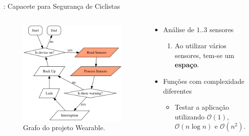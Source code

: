     \begin{frame}{\Wearable: Capacete para Segurança de Ciclistas}
        \vspace{-0.8em}
        
        \begin{columns}
            \begin{column}{0.6\textwidth}
                
                \begin{figure}[h] \centering
                    \includegraphics[width=1\textwidth]{img/capacete2.png}
                    \vspace{-1em}
                    \caption{Grafo do projeto Wearable.}
                \end{figure}
            \end{column}
            \begin{column}{0.4\textwidth}
                \vspace{-1cm}
                \begin{itemize}
                    \setlength{\itemsep}{1.4em}
                    \item Análise de $1..3$ sensores
                    \begin{enumerate}
                        \setlength{\itemsep}{0.8em}
                        \item Ao utilizar vários sensores, tem-se um \textbf{espaço}.
                    \end{enumerate}
                    \item Funções com complexidade diferentes
                    \begin{itemize}
                        \item Testar a aplicação utilizando $\mathcal{O}(1)$, $\mathcal{O}(n\log n)$ e $\mathcal{O}(n^2)$.
                    \end{itemize}
                \end{itemize}
                

\end{column}
\end{columns}
\end{frame}
